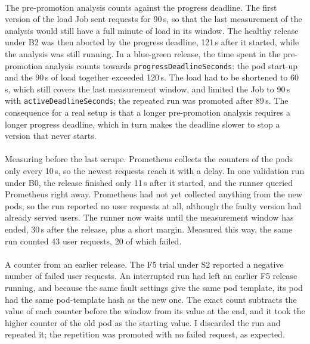\paragraph{} The pre-promotion analysis counts against the progress deadline. The first version of the load Job sent requests for 90\,s, so that the last measurement of the analysis would still have a full minute of load in its window. The healthy release under B2 was then aborted by the progress deadline, 121\,s after it started, while the analysis was still running. In a blue-green release, the time spent in the pre-promotion analysis counts towards \texttt{progressDeadlineSeconds}: the pod start-up and the 90\,s of load together exceeded 120\,s. The load had to be shortened to 60\,s, which still covers the last measurement window, and limited the Job to 90\,s with \texttt{activeDeadlineSeconds}; the repeated run was promoted after 89\,s. The consequence for a real setup is that a longer pre-promotion analysis requires a longer progress deadline, which in turn makes the deadline slower to stop a version that never starts.

\paragraph{} Measuring before the last scrape. Prometheus collects the counters of the pods only every 10\,s, so the newest requests reach it with a delay. In one validation run under B0, the release finished only 11\,s after it started, and the runner queried Prometheus right away. Prometheus had not yet collected anything from the new pods, so the run reported no user requests at all, although the faulty version had already served users. The runner now waits until the measurement window has ended, 30\,s after the release, plus a short margin. Measured this way, the same run counted 43 user requests, 20 of which failed.

\paragraph{} A counter from an earlier release. The F5 trial under S2 reported a negative number of failed user requests. An interrupted run had left an earlier F5 release running, and because the same fault settings give the same pod template, its pod had the same pod-template hash as the new one. The exact count subtracts the value of each counter before the window from its value at the end, and it took the higher counter of the old pod as the starting value. I discarded the run and repeated it; the repetition was promoted with no failed request, as expected.

